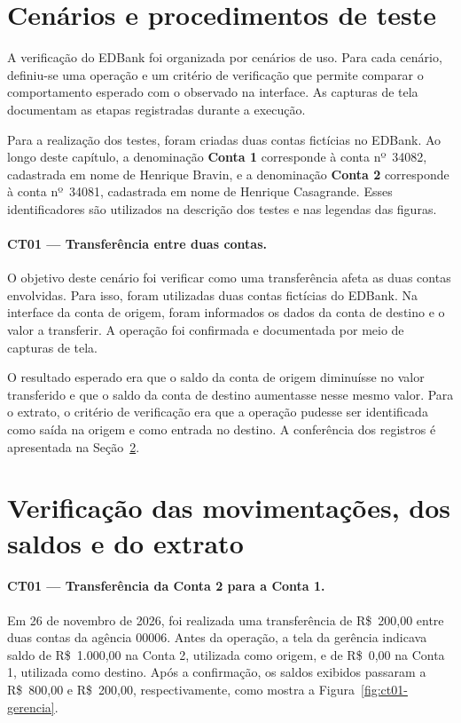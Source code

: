 \section{Cenários e procedimentos de teste}
\label{cap-verificacao-cenarios-testes}

A verificação do EDBank foi organizada por cenários de uso. Para
cada cenário, definiu-se uma operação e um critério de verificação
que permite comparar o comportamento esperado com o observado na
interface. As capturas de tela documentam as etapas registradas
durante a execução.

Para a realização dos testes, foram criadas duas contas fictícias
no EDBank. Ao longo deste capítulo, a denominação \textbf{Conta 1}
corresponde à conta nº~34082, cadastrada em nome de Henrique Bravin,
e a denominação \textbf{Conta 2} corresponde à conta nº~34081,
cadastrada em nome de Henrique Casagrande. Esses identificadores
são utilizados na descrição dos testes e nas legendas das figuras.

\paragraph{CT01 --- Transferência entre duas contas.}
O objetivo deste cenário foi verificar como uma transferência
afeta as duas contas envolvidas. Para isso, foram utilizadas duas
contas fictícias do EDBank. Na interface da conta de origem,
foram informados os dados da conta de destino e o valor a
transferir. A operação foi confirmada e documentada por meio
de capturas de tela.

O resultado esperado era que o saldo da conta de origem diminuísse
no valor transferido e que o saldo da conta de destino aumentasse
nesse mesmo valor. Para o extrato, o critério de verificação era
que a operação pudesse ser identificada como saída na origem e
como entrada no destino. A conferência dos registros é apresentada
na Seção~\ref{cap-verificacao-movimentacoes-saldos-extrato}.

\section{Verificação das movimentações, dos saldos e do extrato}
\label{cap-verificacao-movimentacoes-saldos-extrato}

\paragraph{CT01 --- Transferência da Conta 2 para a Conta 1.}
Em 26 de novembro de 2026, foi realizada uma transferência de
\mbox{R\$~200,00} entre duas contas da agência 00006. Antes da
operação, a tela da gerência indicava saldo de \mbox{R\$~1.000,00}
na Conta 2, utilizada como origem, e de \mbox{R\$~0,00} na Conta 1,
utilizada como destino. Após a confirmação, os saldos exibidos
passaram a \mbox{R\$~800,00} e \mbox{R\$~200,00}, respectivamente,
como mostra a Figura~\ref{fig:ct01-gerencia}.

